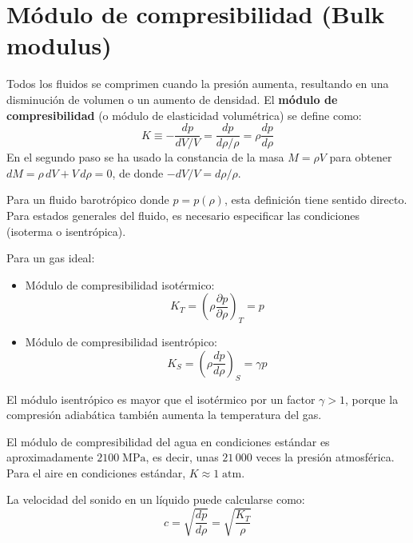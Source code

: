 \section{Módulo de compresibilidad (Bulk modulus)}

Todos los fluidos se comprimen cuando la presión aumenta, resultando en una disminución de volumen o un aumento de densidad. El \textbf{módulo de compresibilidad} (o módulo de elasticidad volumétrica) se define como:
\begin{equation}
    K \equiv -\frac{dp}{dV/V} = \frac{dp}{d\rho/\rho} = \rho\frac{dp}{d\rho}
\end{equation}
En el segundo paso se ha usado la constancia de la masa $M = \rho V$ para obtener $dM = \rho\,dV + V\,d\rho = 0$, de donde $-dV/V = d\rho/\rho$.

Para un fluido barotrópico donde $p = p(\rho)$, esta definición tiene sentido directo. Para estados generales del fluido, es necesario especificar las condiciones (isoterma o isentrópica).

Para un gas ideal:
\begin{itemize}
    \item Módulo de compresibilidad isotérmico:
    \begin{equation}
        K_T = \left(\rho\frac{\partial p}{\partial\rho}\right)_T = p
    \end{equation}
    \item Módulo de compresibilidad isentrópico:
    \begin{equation}
        K_S = \left(\rho\frac{dp}{d\rho}\right)_S = \gamma p
    \end{equation}
\end{itemize}
El módulo isentrópico es mayor que el isotérmico por un factor $\gamma > 1$, porque la compresión adiabática también aumenta la temperatura del gas.

El módulo de compresibilidad del agua en condiciones estándar es aproximadamente $2100\;\text{MPa}$, es decir, unas $21\,000$ veces la presión atmosférica. Para el aire en condiciones estándar, $K \approx 1\;\text{atm}$.

La velocidad del sonido en un líquido puede calcularse como:
\begin{equation}
    c = \sqrt{\frac{dp}{d\rho}} = \sqrt{\frac{K_T}{\rho}}
\end{equation}

